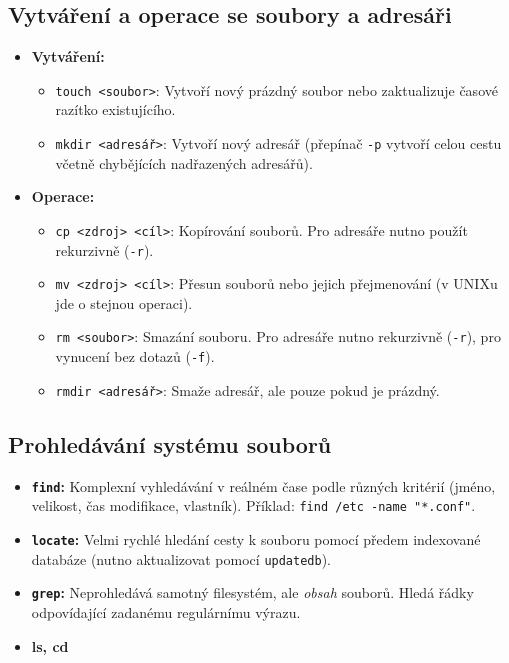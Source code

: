 \subsection{Vytváření a operace se soubory a adresáři}
\begin{itemize}
    \item \textbf{Vytváření:}
    \begin{itemize}
        \item \texttt{touch <soubor>}: Vytvoří nový prázdný soubor nebo zaktualizuje časové razítko existujícího.
        \item \texttt{mkdir <adresář>}: Vytvoří nový adresář (přepínač \texttt{-p} vytvoří celou cestu včetně chybějících nadřazených adresářů).
    \end{itemize}
    \item \textbf{Operace:}
    \begin{itemize}
        \item \texttt{cp <zdroj> <cíl>}: Kopírování souborů. Pro adresáře nutno použít rekurzivně (\texttt{-r}).
        \item \texttt{mv <zdroj> <cíl>}: Přesun souborů nebo jejich přejmenování (v UNIXu jde o stejnou operaci).
        \item \texttt{rm <soubor>}: Smazání souboru. Pro adresáře nutno rekurzivně (\texttt{-r}), pro vynucení bez dotazů (\texttt{-f}).
        \item \texttt{rmdir <adresář>}: Smaže adresář, ale pouze pokud je prázdný.
    \end{itemize}
\end{itemize}

\subsection{Prohledávání systému souborů}
\begin{itemize}
    \item \textbf{\texttt{find}:} Komplexní vyhledávání v reálném čase podle různých kritérií (jméno, velikost, čas modifikace, vlastník). Příklad: \texttt{find /etc -name "*.conf"}.
    \item \textbf{\texttt{locate}:} Velmi rychlé hledání cesty k souboru pomocí předem indexované databáze (nutno aktualizovat pomocí \texttt{updatedb}).
    \item \textbf{\texttt{grep}:} Neprohledává samotný filesystém, ale \textit{obsah} souborů. Hledá řádky odpovídající zadanému regulárnímu výrazu.
    \item \textbf{ls, cd}
\end{itemize}

